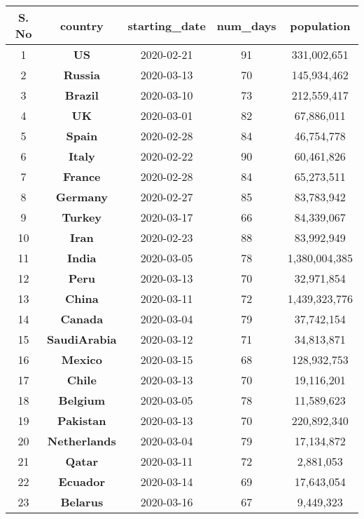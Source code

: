 \begin{table*}
\begin{center}
\begin{tiny}
\begin{tabular}{|c|c|c|c|c|} \hline
\bf{S. No} & \bf{country} & \bf{starting\_date} & \bf{num\_days} & \bf{population}\\ \hline
1 & {\bf US} & 2020-02-21 & 91 & 331,002,651\\ \hline
2 & {\bf Russia} & 2020-03-13 & 70 & 145,934,462\\ \hline
3 & {\bf Brazil} & 2020-03-10 & 73 & 212,559,417\\ \hline
4 & {\bf UK} & 2020-03-01 & 82 & 67,886,011\\ \hline
5 & {\bf Spain} & 2020-02-28 & 84 & 46,754,778\\ \hline
6 & {\bf Italy} & 2020-02-22 & 90 & 60,461,826\\ \hline
7 & {\bf France} & 2020-02-28 & 84 & 65,273,511\\ \hline
8 & {\bf Germany} & 2020-02-27 & 85 & 83,783,942\\ \hline
9 & {\bf Turkey} & 2020-03-17 & 66 & 84,339,067\\ \hline
10 & {\bf Iran} & 2020-02-23 & 88 & 83,992,949\\ \hline
11 & {\bf India} & 2020-03-05 & 78 & 1,380,004,385\\ \hline
12 & {\bf Peru} & 2020-03-13 & 70 & 32,971,854\\ \hline
13 & {\bf China} & 2020-03-11 & 72 & 1,439,323,776\\ \hline
14 & {\bf Canada} & 2020-03-04 & 79 & 37,742,154\\ \hline
15 & {\bf SaudiArabia} & 2020-03-12 & 71 & 34,813,871\\ \hline
16 & {\bf Mexico} & 2020-03-15 & 68 & 128,932,753\\ \hline
17 & {\bf Chile} & 2020-03-13 & 70 & 19,116,201\\ \hline
18 & {\bf Belgium} & 2020-03-05 & 78 & 11,589,623\\ \hline
19 & {\bf Pakistan} & 2020-03-13 & 70 & 220,892,340\\ \hline
20 & {\bf Netherlands} & 2020-03-04 & 79 & 17,134,872\\ \hline
21 & {\bf Qatar} & 2020-03-11 & 72 & 2,881,053\\ \hline
22 & {\bf Ecuador} & 2020-03-14 & 69 & 17,643,054\\ \hline
23 & {\bf Belarus} & 2020-03-16 & 67 & 9,449,323\\ \hline

\end{tabular}
\end{tiny}
\end{center}
\end{table*}
